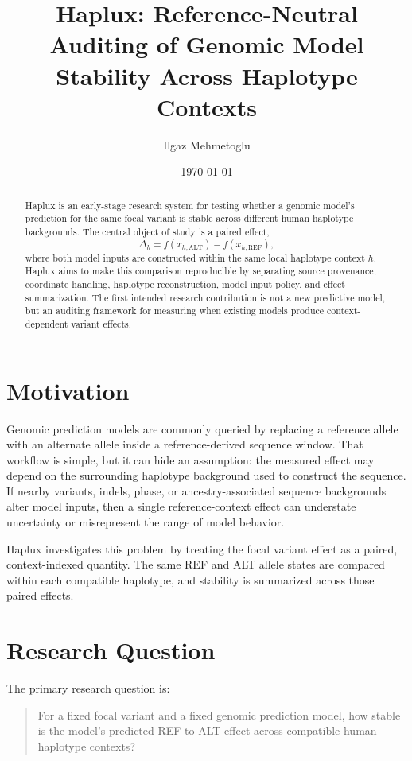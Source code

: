 \documentclass[11pt]{article}
\title{Haplux: Reference-Neutral Auditing of Genomic Model Stability Across Haplotype Contexts}
\author{Ilgaz Mehmetoglu}
\date{\today}
\begin{document}
\maketitle

\begin{abstract}
Haplux is an early-stage research system for testing whether a genomic model's
prediction for the same focal variant is stable across different human haplotype
backgrounds. The central object of study is a paired effect,
\[
  \Delta_h = f(x_{h,\mathrm{ALT}}) - f(x_{h,\mathrm{REF}}),
\]
where both model inputs are constructed within the same local haplotype context
\(h\). Haplux aims to make this comparison reproducible by separating source
provenance, coordinate handling, haplotype reconstruction, model input policy,
and effect summarization. The first intended research contribution is not a new
predictive model, but an auditing framework for measuring when existing models
produce context-dependent variant effects.
\end{abstract}

\section{Motivation}

Genomic prediction models are commonly queried by replacing a reference allele
with an alternate allele inside a reference-derived sequence window. That
workflow is simple, but it can hide an assumption: the measured effect may depend
on the surrounding haplotype background used to construct the sequence. If nearby
variants, indels, phase, or ancestry-associated sequence backgrounds alter model
inputs, then a single reference-context effect can understate uncertainty or
misrepresent the range of model behavior.

Haplux investigates this problem by treating the focal variant effect as a
paired, context-indexed quantity. The same REF and ALT allele states are compared
within each compatible haplotype, and stability is summarized across those
paired effects.

\section{Research Question}

The primary research question is:

\begin{quote}
For a fixed focal variant and a fixed genomic prediction model, how stable is the
model's predicted REF-to-ALT effect across compatible human haplotype contexts?
\end{quote}
\end{document}
